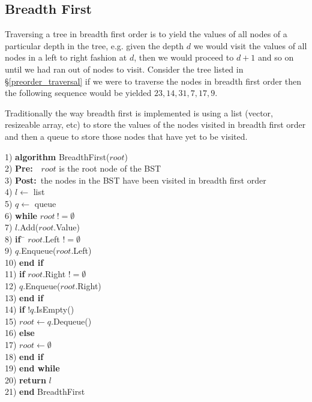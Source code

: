 \subsection{Breadth First}
Traversing a tree in breadth first order is to yield the values of all nodes of a particular depth in the tree, e.g. given the depth $d$ we would visit the values of all nodes in a left to right fashion at $d$, then we would proceed to $d+1$ and so on until we had ran out of nodes to visit. Consider the tree listed in \S\ref{preorder_traversal} if we were to traverse the nodes in breadth first order then the following sequence would be yielded $23, 14, 31, 7, 17, 9$. 

Traditionally the way breadth first is implemented is using a list (vector, resizeable array, etc) to store the values of the nodes visited in breadth first order and then a queue to store those nodes that have yet to be visited.

\begin{tabbing}
1)  \textbf{alg}\= \textbf{orithm} BreadthFirst($root$) \\
2)  \> \textbf{Pre:}~~$root$ is the root node of the BST \\
3)  \> \textbf{Post:}~the nodes in the BST have been visited in breadth first order \\
4)  \> $l \leftarrow$ list \\
5)  \> $q \leftarrow$ queue \\
6)  \> \textbf{whi}\= \textbf{le} $root~!= \emptyset$ \\
7)  \> \> $l$.Add($root$.Value) \\
8)  \> \> \textbf{if}~\= $root$.Left $!= \emptyset$ \\
9)  \> \> \> $q$.Enqueue($root$.Left) \\
10) \> \> \textbf{end if} \\
11) \> \> \textbf{if} $root$.Right $!= \emptyset$ \\
12) \> \> \> $q$.Enqueue($root$.Right) \\
13) \> \> \textbf{end if} \\
14) \> \> \textbf{if} $!q$.IsEmpty() \\
15) \> \> \> $root \leftarrow q$.Dequeue() \\
16) \> \> \textbf{else} \\
17) \> \> \> $root \leftarrow \emptyset$ \\
18) \> \> \textbf{end if} \\
19) \> \textbf{end while} \\
20) \> \textbf{return} $l$ \\
21) \textbf{end} BreadthFirst \\
\end{tabbing}
